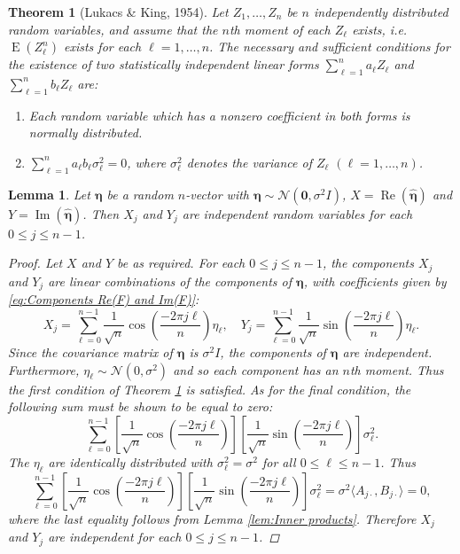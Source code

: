 \documentclass[12pt]{article}
\newcommand{\noise}{\eta}	%
\newcommand{\noiseSD}{\sigma}	%
\newcommand{\noiseVec}{\bm{\noise}}	%
\newcommand{\E}{\operatorname{E}}	%
\renewcommand{\Re}{\operatorname{Re}}	%
\renewcommand{\Im}{\operatorname{Im}}	%
\newtheorem{lemma}{Lemma}[section]
\newtheorem{theorem}{Theorem}[section]
\begin{document}
\begin{theorem}[Lukacs \& King, 1954]
\label{thm:Independence Theorem}
Let $Z_1,\ldots,Z_n$ be $n$ independently distributed random variables, and assume that the $n$th moment of each $Z_{\ell}$ exists, i.e. $\E(Z_\ell^n)$ exists for each $\ell = 1,\ldots,n$. The necessary and sufficient conditions for the existence of two statistically independent linear forms $\sum_{\ell=1}^n a_{\ell}Z_{\ell}$ and $\sum_{\ell=1}^n b_{\ell}Z_{\ell}$ are:
\begin{enumerate}[label=(\roman*)]
\item Each random variable which has a nonzero coefficient in both forms is normally distributed.
\item $\sum_{\ell=1}^n a_{\ell}b_{\ell}\sigma_{\ell}^2 = 0$, where $\sigma_{\ell}^2$ denotes the variance of $Z_{\ell}$ $(\ell = 1,\ldots,n)$.
\end{enumerate}
\end{theorem}

\begin{lemma}
\label{lem:App of Ind Thm}
Let $\noiseVec$ be a random $n$-vector with $\noiseVec \sim \mathcal{N}(\bm{0},\noiseSD^2 I)$, $X = \Re(\widehat{\noiseVec})$ and $Y = \Im(\widehat{\noiseVec})$. Then $X_j$ and $Y_j$ are independent random variables for each $0 \leq j \leq n-1$.
\begin{proof}
Let $X$ and $Y$ be as required. For each $0 \leq j \leq n-1$, the components $X_j$ and $Y_j$ are linear combinations of the components of $\noiseVec$, with coefficients given by \eqref{eq:Components Re(F) and Im(F)}:
\[X_j = \sum_{\ell=0}^{n-1} \frac{1}{\sqrt{n}}\cos\left(\frac{-2\pi{j\ell}}{n}\right)\noise_{\ell}, \quad Y_j = \sum_{\ell=0}^{n-1} \frac{1}{\sqrt{n}}\sin\left(\frac{-2\pi{j\ell}}{n}\right)\noise_{\ell}.\]
Since the covariance matrix of $\noiseVec$ is $\noiseSD^2 I$, the components of $\noiseVec$ are independent. Furthermore, $\noise_{\ell} \sim \mathcal{N}(0,\noiseSD^2)$ and so each component has an $n$th moment. Thus the first condition of Theorem \ref{thm:Independence Theorem} is satisfied. As for the final condition, the following sum must be shown to be equal to zero:
\[\sum_{\ell=0}^{n-1} \left[\frac{1}{\sqrt{n}}\cos\left(\frac{-2\pi{j\ell}}{n}\right)\right]\left[\frac{1}{\sqrt{n}}\sin\left(\frac{-2\pi{j\ell}}{n}\right)\right]\noiseSD_{\ell}^2.\]
The $\noise_{\ell}$ are identically distributed with $\noiseSD_{\ell}^2 = \noiseSD^2$ for all $0 \leq \ell \leq n-1$. Thus
\[\sum_{\ell=0}^{n-1} \left[\frac{1}{\sqrt{n}}\cos\left(\frac{-2\pi{j\ell}}{n}\right)\right]\left[\frac{1}{\sqrt{n}}\sin\left(\frac{-2\pi{j\ell}}{n}\right)\right]\noiseSD_\ell^2 = \noiseSD^2 \langle A_{j\cdot},B_{j\cdot}\rangle = 0,\]
where the last equality follows from Lemma \ref{lem:Inner products}. Therefore $X_j$ and $Y_j$ are independent for each $0 \leq j \leq n-1$.
\end{proof}
\end{lemma}
\end{document}
